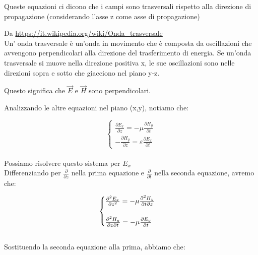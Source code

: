 Queste equazioni ci dicono che i campi sono trasversali rispetto alla direzione di propagazione (considerando 
l'asse z come asse di propagazione)

\begin{tcolorbox}
    Da \url{https://it.wikipedia.org/wiki/Onda_trasversale} \\
    Un' onda trasversale è un'onda in movimento che è composta da oscillazioni che avvengono perpendicolari alla direzione del trasferimento di energia. Se un'onda trasversale si muove nella direzione positiva x, le sue oscillazioni sono nelle direzioni sopra e sotto che giacciono nel piano y-z.
\end{tcolorbox}

Questo significa che $\vec{E}$ e $\vec{H}$ sono perpendicolari. 

Analizzando le altre equazioni nel piano (x,y), notiamo che: 

{ \Large \begin{equation}
    \begin{cases}
        \frac{\partial E_x}{\partial z} = -\mu \frac{\partial H_y}{\partial t} \\
        -\frac{\partial H_y}{\partial z} = \varepsilon \frac{\partial E_x}{\partial t} 

    \end{cases}
\end{equation}} \\ 

Possiamo risolvere questo sistema per $E_x$ \\ 

Differenziando per $\frac{\partial}{\partial z}$ nella prima equazione e $\frac{\partial}{\partial t}$ 
nella seconda equazione, avremo che: 

{ \Large \begin{equation}
    \begin{cases}
        \pdv[2]{E_x}{z} = - \mu \pdv{H_y}{t}{z} \\ \\  
        \pdv[2]{H_y}{z}{t} = - \mu \pdv{E_y}{t} \\ 
        
    \end{cases}
\end{equation}} \\ 

Sostituendo la seconda equazione alla prima, abbiamo che: \\ \\ 

